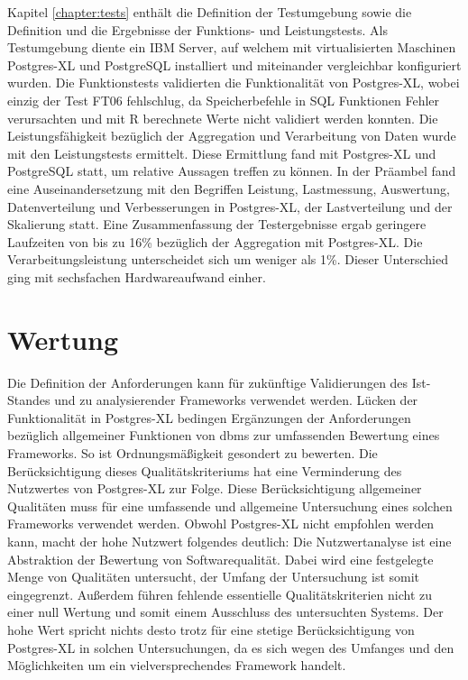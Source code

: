 Kapitel \ref{chapter:tests} enthält die Definition der Testumgebung sowie die Definition und die Ergebnisse der Funktions- und Leistungstests.
Als Testumgebung diente ein IBM Server, auf welchem mit virtualisierten Maschinen Postgres-XL und PostgreSQL installiert und miteinander vergleichbar konfiguriert wurden.
Die Funktionstests validierten die Funktionalität von Postgres-XL, wobei einzig der Test FT06 fehlschlug, da Speicherbefehle in SQL Funktionen Fehler verursachten und mit R berechnete Werte nicht validiert werden konnten.
Die Leistungsfähigkeit bezüglich der Aggregation und Verarbeitung von Daten wurde mit den Leistungstests ermittelt.
Diese Ermittlung fand mit Postgres-XL und PostgreSQL statt, um relative Aussagen treffen zu können.
In der Präambel fand eine Auseinandersetzung mit den Begriffen Leistung, Lastmessung, Auswertung, Datenverteilung und Verbesserungen in Postgres-XL, der Lastverteilung und der Skalierung statt.
Eine Zusammenfassung der Testergebnisse ergab geringere Laufzeiten von bis zu 16\%{} bezüglich der Aggregation mit Postgres-XL.
Die Verarbeitungsleistung unterscheidet sich um weniger als 1\%{}.
Dieser Unterschied ging mit sechsfachen Hardwareaufwand einher.

\section{Wertung}
Die Definition der Anforderungen kann für zukünftige Validierungen des Ist-Standes und zu analysierender Frameworks verwendet werden.
Lücken der Funktionalität in Postgres-XL bedingen Ergänzungen der Anforderungen bezüglich allgemeiner Funktionen von \Gls{dbms} zur umfassenden Bewertung eines Frameworks.
So ist Ordnungsmäßigkeit gesondert zu bewerten.
Die Berücksichtigung dieses Qualitätskriteriums hat eine Verminderung des Nutzwertes von Postgres-XL zur Folge.
Diese Berücksichtigung allgemeiner Qualitäten muss für eine umfassende und allgemeine Untersuchung eines solchen Frameworks verwendet werden.
Obwohl Postgres-XL nicht empfohlen werden kann, macht der hohe Nutzwert folgendes deutlich: 
Die Nutzwertanalyse ist eine Abstraktion der Bewertung von Softwarequalität.
Dabei wird eine festgelegte Menge von Qualitäten untersucht, der Umfang der Untersuchung ist somit eingegrenzt.
Außerdem führen fehlende essentielle Qualitätskriterien nicht zu einer null Wertung und somit einem Ausschluss des untersuchten Systems.
Der hohe Wert spricht nichts desto trotz für eine stetige Berücksichtigung von Postgres-XL in solchen Untersuchungen, da es sich wegen des Umfanges und den Möglichkeiten um ein vielversprechendes Framework handelt.


